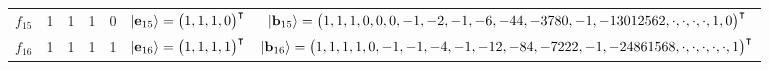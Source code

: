 \documentclass{ws-procs9x6}
\begin{document}
\begin{sidewaystable}
{\begin{tabular}{ccccccc}
$f_{15}$&1  &  1 &   1 &   0  & $\vert {\bf e}_{15} \rangle=\begin{pmatrix} 1  ,  1 ,   1 ,   0  \end{pmatrix}^\intercal$&{\scriptsize$\vert {\bf b}_{15} \rangle=\begin{pmatrix}1 , 1 , 1 , 0 , 0 , 0 , -1 , -2 , -1 , -6 , -44 , -3780 , -1 , -13012562 , \cdot ,\cdot , \cdot , \cdot , 1 , 0 \end{pmatrix}^\intercal         $}\\
$f_{16}$&1  &  1 &   1 &   1  & $\vert {\bf e}_{16} \rangle=\begin{pmatrix} 1  ,  1 ,   1 ,   1  \end{pmatrix}^\intercal$&{\scriptsize$\vert {\bf b}_{16} \rangle=\begin{pmatrix}1 , 1 , 1 , 1 , 0 , -1 , -1 , -4 , -1 , -12 , -84 , -7222 , -1 , -24861568 , \cdot , \cdot , \cdot , \cdot , \cdot , 1 \end{pmatrix}^\intercal  $}\\
\bottomrule
\end{tabular} }
\end{sidewaystable}
\end{document}
